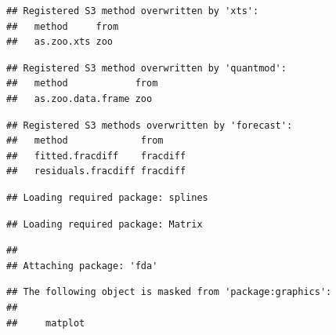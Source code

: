 \documentclass[]{article}
\newenvironment{Shaded}{\begin{snugshade}}{\end{snugshade}}
\newcommand{\CommentTok}[1]{\textcolor[rgb]{0.56,0.35,0.01}{\textit{#1}}}
\newcommand{\DataTypeTok}[1]{\textcolor[rgb]{0.13,0.29,0.53}{#1}}
\newcommand{\DecValTok}[1]{\textcolor[rgb]{0.00,0.00,0.81}{#1}}
\newcommand{\KeywordTok}[1]{\textcolor[rgb]{0.13,0.29,0.53}{\textbf{#1}}}
\newcommand{\NormalTok}[1]{#1}
\newcommand{\OperatorTok}[1]{\textcolor[rgb]{0.81,0.36,0.00}{\textbf{#1}}}
\newcommand{\StringTok}[1]{\textcolor[rgb]{0.31,0.60,0.02}{#1}}
\begin{document}
\begin{Shaded}
\end{Shaded}

\begin{verbatim}
## Registered S3 method overwritten by 'xts':
##   method     from
##   as.zoo.xts zoo
\end{verbatim}

\begin{verbatim}
## Registered S3 method overwritten by 'quantmod':
##   method            from
##   as.zoo.data.frame zoo
\end{verbatim}

\begin{verbatim}
## Registered S3 methods overwritten by 'forecast':
##   method             from    
##   fitted.fracdiff    fracdiff
##   residuals.fracdiff fracdiff
\end{verbatim}

\begin{verbatim}
## Loading required package: splines
\end{verbatim}

\begin{verbatim}
## Loading required package: Matrix
\end{verbatim}

\begin{verbatim}
## 
## Attaching package: 'fda'
\end{verbatim}

\begin{verbatim}
## The following object is masked from 'package:graphics':
## 
##     matplot
\end{verbatim}
\end{document}

